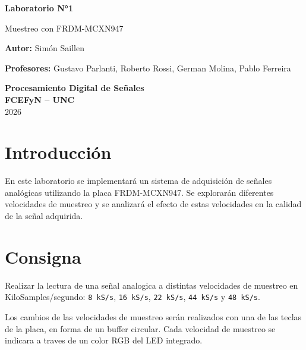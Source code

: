 \documentclass[11pt,a4paper]{article}
\begin{document}
\begin{titlepage}
    \begin{center}
        \vspace*{1cm}

        \Huge
        \textbf{Laboratorio N°1}

        \vspace{0.5cm}
        \LARGE
        Muestreo con FRDM-MCXN947

        \vspace{1.5cm}

        \vfill

        \Large
        \textbf{Autor:} Simón Saillen

        \Large
        \textbf{Profesores:} Gustavo Parlanti, Roberto Rossi, German Molina, Pablo Ferreira

        \vspace{0.5cm}

        \Large
        \textbf{Procesamiento Digital de Señales}\\
        \vspace{0.2cm}
        \textbf{FCEFyN -- UNC}\\
        \vspace{0.2cm}
        2026

    \end{center}
\end{titlepage}
\newpage

\section{Introducción}

En este laboratorio se implementará un sistema de adquisición de señales
analógicas utilizando la placa FRDM-MCXN947. Se explorarán diferentes
velocidades de muestreo y se analizará el efecto de estas velocidades en la
calidad de la señal adquirida.

\section{Consigna}

Realizar la lectura de una señal analogica a distintas velocidades de muestreo
en KiloSamples/segundo: \texttt{8 kS/s}, \texttt{16 kS/s}, \texttt{22 kS/s},
\texttt{44 kS/s} y \texttt{48 kS/s}.

Los cambios de las velocidades de muestreo serán realizados con una de las
teclas de la placa, en forma de un buffer circular. Cada velocidad de muestreo
se indicara a traves de un color RGB del LED integrado.
\end{document}
